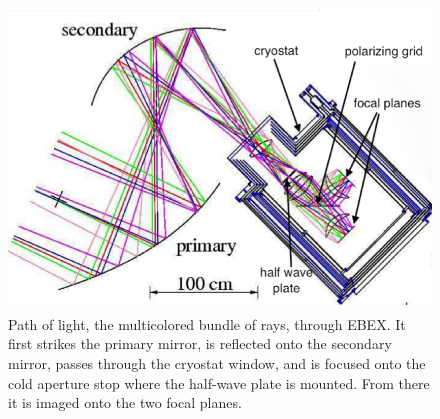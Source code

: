 \begin{figure}[htbp]
\begin{center}
\includegraphics[height=3.2in]{figures/ebex_optical_path.png}
\caption[EBEX optical path]{Path of light, the multicolored bundle of rays, through \ac{EBEX}. It first strikes the primary mirror, is reflected onto the secondary mirror, passes through the cryostat window, and is focused onto the cold aperture stop where the half-wave plate is mounted. From there it is imaged onto the two focal planes. 
\label{fig:optical_path} }
\end{center}
\end{figure}

